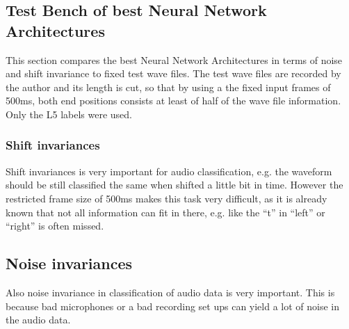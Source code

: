 \subsection{Test Bench of best Neural Network Architectures}
This section compares the best Neural Network Architectures in terms of noise and shift invariance to fixed test wave files.
The test wave files are recorded by the author and its length is cut, so that by using a the fixed input frames of 500ms, both end positions consists at least of half of the wave file information.
Only the L5 labels were used.

\subsubsection{Shift invariances}
Shift invariances is very important for audio classification, e.g. the waveform should be still classified the same when shifted a little bit in time.
However the restricted frame size of 500ms makes this task very difficult, as it is already known that not all information can fit in there, e.g. like the \enquote{t} in \enquote{left} or \enquote{right} is often missed.

\subsection{Noise invariances}
Also noise invariance in classification of audio data is very important. 
This is because bad microphones or a bad recording set ups can yield a lot of noise in the audio data.
